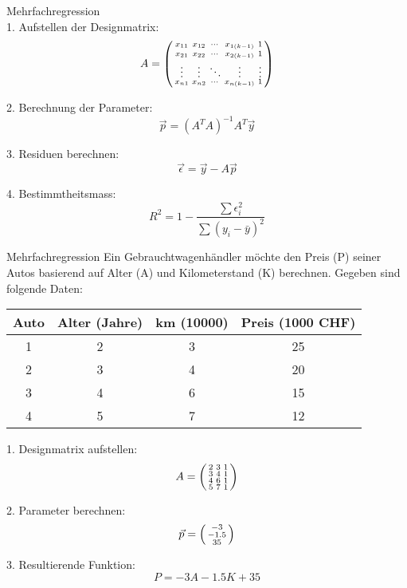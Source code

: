 \begin{KR}{Mehrfachregression}\\
1. Aufstellen der Designmatrix:
   $$A = \begin{psmallmatrix} 
   x_{11} & x_{12} & \cdots & x_{1(k-1)} & 1 \\
   x_{21} & x_{22} & \cdots & x_{2(k-1)} & 1 \\
   \vdots & \vdots & \ddots & \vdots & \vdots \\
   x_{n1} & x_{n2} & \cdots & x_{n(k-1)} & 1
   \end{psmallmatrix}$$

2. Berechnung der Parameter:
   $$\vec{p} = (A^T A)^{-1} A^T \vec{y}$$

3. Residuen berechnen:
   $$\vec{\epsilon} = \vec{y} - A\vec{p}$$

4. Bestimmtheitsmass:
   $$R^2 = 1 - \frac{\sum \epsilon_i^2}{\sum(y_i - \bar{y})^2}$$
\end{KR}

\begin{example2}{Mehrfachregression}
Ein Gebrauchtwagenhändler möchte den Preis (P) seiner Autos basierend auf Alter (A) und Kilometerstand (K) berechnen.
Gegeben sind folgende Daten:

\begin{center}
\begin{tabular}{|c|c|c|c|}
\hline
Auto & Alter (Jahre) & km (10000) & Preis (1000 CHF) \\
\hline
1 & 2 & 3 & 25 \\
2 & 3 & 4 & 20 \\
3 & 4 & 6 & 15 \\
4 & 5 & 7 & 12 \\
\hline
\end{tabular}
\end{center}

1. Designmatrix aufstellen:
   $$A = \begin{psmallmatrix}
   2 & 3 & 1 \\
   3 & 4 & 1 \\
   4 & 6 & 1 \\
   5 & 7 & 1
   \end{psmallmatrix}$$

2. Parameter berechnen:
   $$\vec{p} = \begin{psmallmatrix} -3 \\ -1.5 \\ 35 \end{psmallmatrix}$$

3. Resultierende Funktion:
   $$P = -3A - 1.5K + 35$$
\end{example2}

